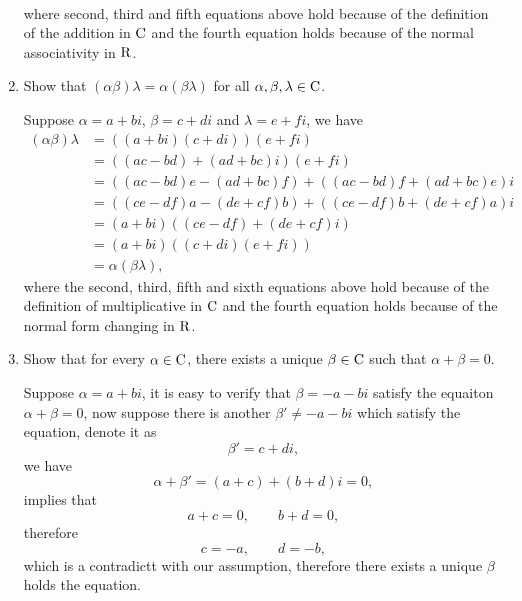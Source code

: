 \begin{enumerate}
\begin{solution}
\begin{align*}
            \end{align*}
            where second, third and fifth equations above hold because of the definition of the addition in $\mathrm{C}$ and the fourth 
            equation holds because of the normal associativity in $\mathrm{R}$.
        \end{solution}
    \item Show that $(\alpha \beta) \lambda = \alpha(\beta \lambda)$ for all $\alpha, \beta, \lambda \in \mathrm{C}$.
        \begin{solution}
            Suppose $\alpha = a+bi$, $\beta = c+di$ and $\lambda = e+fi$, we have 
            \begin{align*}
                (\alpha \beta) \lambda &= \left((a+bi)(c+di)\right)(e+fi) \\
                                       &= ((ac-bd)+(ad+bc)i)(e+fi) \\
                                       &= ((ac-bd)e-(ad+bc)f) + ((ac-bd)f + (ad+bc)e)i \\
                                       &= ((ce-df)a-(de+cf)b) + ((ce-df)b + (de+cf)a) i \\
                                       &= (a+bi)((ce-df)+(de+cf)i) \\
                                       &= (a+bi)((c+di)(e+fi)) \\
                                       &= \alpha (\beta \lambda),
            \end{align*}
            where the second, third, fifth and sixth equations above hold because of the definition of multiplicative in $\mathrm{C}$ and 
            the fourth equation holds because of the normal form changing in $\mathrm{R}$.
        \end{solution}
    \item Show that for every $\alpha \in \mathrm{C}$, there exists a unique $\beta \in \mathrm{C}$ such that $\alpha + \beta = 0$.
        \begin{solution}
            Suppose $\alpha = a + bi$, it is easy to verify that $\beta = -a - bi$ satisfy the equaiton $\alpha + \beta = 0$, 
            now suppose there is another $\beta' \neq -a - bi$ which satisfy the equation, denote it as 
            \[ \beta' = c + di,\]
            we have 
            \[ \alpha + \beta' = (a+c) + (b+d)i = 0,\]
            implies that 
            \[ a + c = 0, \qquad b + d = 0,\]
            therefore 
            \[ c= -a, \qquad d=-b ,\]
            which is a contradictt with our assumption, therefore there exists a unique $\beta$ holds the equation.

\end{solution}
\end{enumerate}
